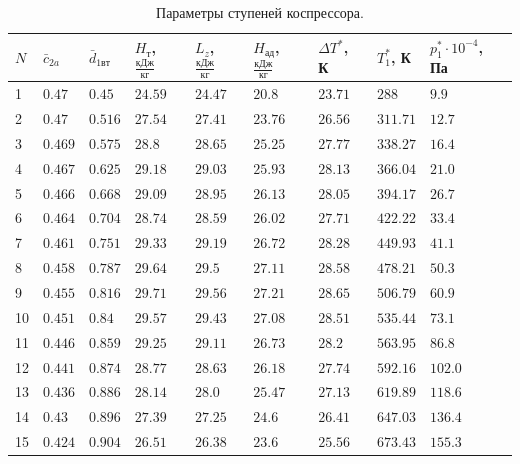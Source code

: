 \documentclass[a4paper,12pt]{article}
\begin{document}
    \begin{longtable}{|p{0.6cm}|p{1.3cm}|p{1.2cm}|p{1.2cm}|p{1.2cm}|p{1.2cm}|p{1.2cm}|p{1.2cm}|p{1.2cm}|}
        \caption{Параметры ступеней коспрессора.}\\ \hline
        $N$ & $\bar{c}_{2a}$ & $\bar{d}_{1вт}$ & $H_т$, $\frac{кДж}{кг}$ & $L_z$, $\frac{кДж}{кг}$
        & $H_{ад}$, $\frac{кДж}{кг}$ & $\Delta T^*$, К & $T_1^*$, К&
        $p_1^* \cdot 10^{-4}$, Па   \\ \hline
%        
        1 & $0.47$ & $0.45$ &
        $24.59$ &
        $24.47$ & $20.8$ &
        $23.71$ & $288$ &
        $9.9$  \\ \hline
%        
        2 & $0.47$ & $0.516$ &
        $27.54$ &
        $27.41$ & $23.76$ &
        $26.56$ & $311.71$ &
        $12.7$  \\ \hline
%        
        3 & $0.469$ & $0.575$ &
        $28.8$ &
        $28.65$ & $25.25$ &
        $27.77$ & $338.27$ &
        $16.4$  \\ \hline
%        
        4 & $0.467$ & $0.625$ &
        $29.18$ &
        $29.03$ & $25.93$ &
        $28.13$ & $366.04$ &
        $21.0$  \\ \hline
%        
        5 & $0.466$ & $0.668$ &
        $29.09$ &
        $28.95$ & $26.13$ &
        $28.05$ & $394.17$ &
        $26.7$  \\ \hline
%        
        6 & $0.464$ & $0.704$ &
        $28.74$ &
        $28.59$ & $26.02$ &
        $27.71$ & $422.22$ &
        $33.4$  \\ \hline
%        
        7 & $0.461$ & $0.751$ &
        $29.33$ &
        $29.19$ & $26.72$ &
        $28.28$ & $449.93$ &
        $41.1$  \\ \hline
%        
        8 & $0.458$ & $0.787$ &
        $29.64$ &
        $29.5$ & $27.11$ &
        $28.58$ & $478.21$ &
        $50.3$  \\ \hline
%        
        9 & $0.455$ & $0.816$ &
        $29.71$ &
        $29.56$ & $27.21$ &
        $28.65$ & $506.79$ &
        $60.9$  \\ \hline
%        
        10 & $0.451$ & $0.84$ &
        $29.57$ &
        $29.43$ & $27.08$ &
        $28.51$ & $535.44$ &
        $73.1$  \\ \hline
%        
        11 & $0.446$ & $0.859$ &
        $29.25$ &
        $29.11$ & $26.73$ &
        $28.2$ & $563.95$ &
        $86.8$  \\ \hline
%        
        12 & $0.441$ & $0.874$ &
        $28.77$ &
        $28.63$ & $26.18$ &
        $27.74$ & $592.16$ &
        $102.0$  \\ \hline
%        
        13 & $0.436$ & $0.886$ &
        $28.14$ &
        $28.0$ & $25.47$ &
        $27.13$ & $619.89$ &
        $118.6$  \\ \hline
%        
        14 & $0.43$ & $0.896$ &
        $27.39$ &
        $27.25$ & $24.6$ &
        $26.41$ & $647.03$ &
        $136.4$  \\ \hline
%        
        15 & $0.424$ & $0.904$ &
        $26.51$ &
        $26.38$ & $23.6$ &
        $25.56$ & $673.43$ &
        $155.3$  \\ \hline
%        
    \end{longtable}
\end{document}
